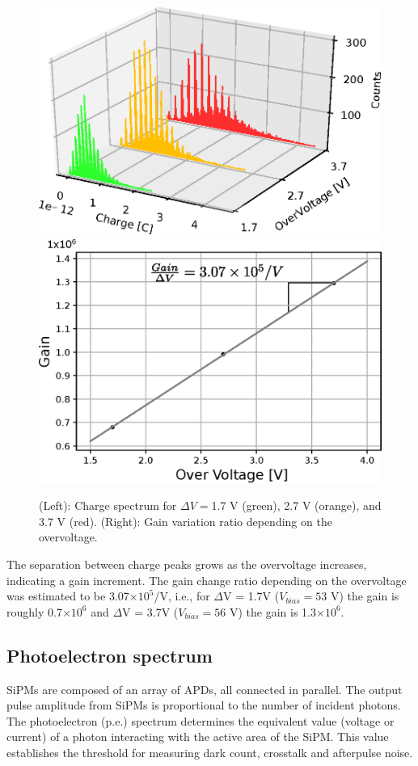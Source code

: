 \documentclass[a4paper,11pt]{article}
\begin{document}
\begin{figure}[htbp]
\centering %
\includegraphics[width=.49\textwidth]{Figures/GainCharge.eps}
\quad
\includegraphics[width=.47\textwidth]{Figures/G_OV_1350CS.eps}
\caption{\label{fig:gain} (Left): Charge spectrum for $\Delta V=$1.7 V (green), 2.7 V (orange), and 3.7 V (red). (Right): Gain variation ratio depending on the overvoltage.}
\end{figure}

The separation between charge peaks grows as the overvoltage increases, indicating a gain increment. The gain change ratio depending on the overvoltage was estimated to be 3.07$\times10^5$/V, i.e., for $\Delta$V = 1.7V ($V_{bias} = 53$ V) the gain is roughly 0.7$\times10^6$ and $\Delta$V = 3.7V ($V_{bias} = 56$ V) the gain is 1.3$\times10^6$.

\subsection{Photoelectron spectrum}

SiPMs are composed of an array of APDs, all connected in parallel. The output pulse amplitude from SiPMs is proportional to the number of incident photons. The photoelectron (p.e.) spectrum determines the equivalent value (voltage or current) of a photon interacting with the active area of the SiPM. This value establishes the threshold for measuring dark count, crosstalk and afterpulse noise.
\end{document}
